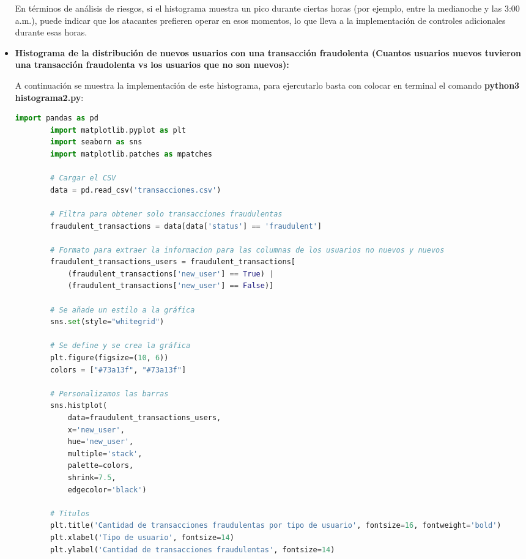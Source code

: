 \documentclass{article}
\begin{document}
\begin{itemize}
        En términos de análisis de riesgos, si el histograma muestra un pico durante ciertas horas (por ejemplo, entre la medianoche y las 3:00 a.m.), puede indicar que los atacantes prefieren operar en esos momentos, lo que lleva a la implementación de controles adicionales durante esas horas.

    \item \textbf{Histograma de la distribución de nuevos usuarios con una transacción fraudolenta (Cuantos usuarios nuevos tuvieron una transacción fraudolenta vs los usuarios que no son nuevos):}

    A continuación se muestra la implementación de este histograma, para ejercutarlo basta con colocar en terminal el comando \textbf{python3 histograma2.py}:

    \begin{lstlisting}[language=Python, caption=Implementación de histograma de la distribución de nuevos usuarios con una transacción fraudolenta.]
        import pandas as pd
        import matplotlib.pyplot as plt
        import seaborn as sns
        import matplotlib.patches as mpatches
        
        # Cargar el CSV
        data = pd.read_csv('transacciones.csv')
        
        # Filtra para obtener solo transacciones fraudulentas
        fraudulent_transactions = data[data['status'] == 'fraudulent']
        
        # Formato para extraer la informacion para las columnas de los usuarios no nuevos y nuevos
        fraudulent_transactions_users = fraudulent_transactions[
            (fraudulent_transactions['new_user'] == True) | 
            (fraudulent_transactions['new_user'] == False)]
        
        # Se añade un estilo a la gráfica
        sns.set(style="whitegrid")
        
        # Se define y se crea la gráfica
        plt.figure(figsize=(10, 6)) 
        colors = ["#73a13f", "#73a13f"]
        
        # Personalizamos las barras
        sns.histplot(
            data=fraudulent_transactions_users, 
            x='new_user', 
            hue='new_user',  
            multiple='stack', 
            palette=colors,
            shrink=7.5,  
            edgecolor='black')
        
        # Titulos
        plt.title('Cantidad de transacciones fraudulentas por tipo de usuario', fontsize=16, fontweight='bold')
        plt.xlabel('Tipo de usuario', fontsize=14)
        plt.ylabel('Cantidad de transacciones fraudulentas', fontsize=14)
        

\end{lstlisting}
\end{itemize}
\end{document}
